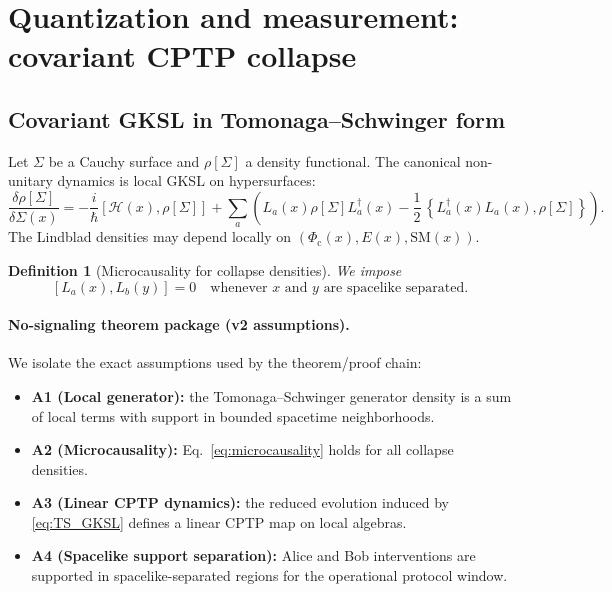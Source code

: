 \documentclass[reprint,amsmath,amssymb,aps,showkeys]{revtex4-2}
\newtheorem{definition}{Definition}
\theoremstyle{remark}
\newcommand{\Comm}[2]{\left[#1,#2\right]}
\newcommand{\AComm}[2]{\left\{#1,#2\right\}}
\newcommand{\Phic}{\Phi_{\mathrm{c}}}
\newcommand{\Eth}{E}
\newcommand{\cH}{\mathcal{H}}
\begin{document}
\section{Quantization and measurement: covariant CPTP collapse}
\label{sec:measurement}

\subsection{Covariant GKSL in Tomonaga--Schwinger form}
Let $\Sigma$ be a Cauchy surface and $\rho[\Sigma]$ a density functional. The canonical
non-unitary dynamics is local GKSL on hypersurfaces:
\begin{equation}
\frac{\delta \rho[\Sigma]}{\delta \Sigma(x)}
=
-\frac{i}{\hbar}\Comm{\cH(x)}{\rho[\Sigma]}
+
\sum_a \left(
L_a(x)\rho[\Sigma]L_a^\dagger(x)
-\frac12\,\AComm{L_a^\dagger(x)L_a(x)}{\rho[\Sigma]}
\right).
\label{eq:TS_GKSL}
\end{equation}
The Lindblad densities may depend locally on $(\Phic(x),\Eth(x),\text{SM}(x))$.

\begin{definition}[Microcausality for collapse densities]
We impose
\begin{equation}
\Comm{L_a(x)}{L_b(y)}=0 \quad \text{whenever $x$ and $y$ are spacelike separated.}
\label{eq:microcausality}
\end{equation}
\end{definition}

\paragraph{No-signaling theorem package (v2 assumptions).}
We isolate the exact assumptions used by the theorem/proof chain:
\begin{itemize}[leftmargin=*]
\item \textbf{A1 (Local generator):} the Tomonaga--Schwinger generator density is a sum of local terms with support in bounded spacetime neighborhoods.
\item \textbf{A2 (Microcausality):} Eq.~\eqref{eq:microcausality} holds for all collapse densities.
\item \textbf{A3 (Linear CPTP dynamics):} the reduced evolution induced by \eqref{eq:TS_GKSL} defines a linear CPTP map on local algebras.
\item \textbf{A4 (Spacelike support separation):} Alice and Bob interventions are supported in spacelike-separated regions for the operational protocol window.
\end{itemize}
\end{document}
